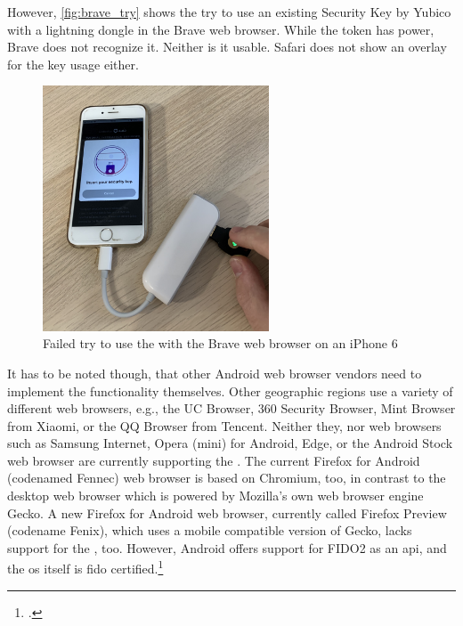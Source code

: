 However, \autoref{fig:brave_try} shows the try to use an existing Security Key by Yubico with a lightning dongle in the Brave web browser. While the token has power, Brave does not recognize it. Neither is it usable. Safari does not show an overlay for the key usage either.

\begin{figure}[hbt]
	\centering
	\includegraphics[width=0.6\textwidth]{pics/brave_try_dongle.eps}
	\caption[Failed try to use the \wa{} with the Brave web browser on an iPhone 6]{Failed try to use the \wa{} with the Brave web browser on an iPhone 6\footnotemark}
	\label{fig:brave_try}
\end{figure}

It has to be noted though, that other Android web browser vendors need to implement the functionality themselves. Other geographic regions use a variety of different web browsers, e.g., the UC Browser, 360 Security Browser, Mint Browser from Xiaomi, or the QQ Browser from Tencent. Neither they, nor web browsers such as Samsung Internet, Opera (mini) for Android, Edge, or the Android Stock web browser are currently supporting the \wa. The current Firefox for Android (codenamed \frqq Fennec\flqq) web browser is based on Chromium, too, in contrast to the desktop web browser which is powered by Mozilla's own web browser engine Gecko. A new Firefox for Android web browser, currently called Firefox Preview (codename \frqq Fenix\flqq), which uses a mobile compatible version of Gecko, lacks support for the \wa, too. However, Android offers support for FIDO2 as an \gls{api}, and the \gls{os} itself is \gls{fido} certified.\footcites[See][24]{fido-ct-3}

